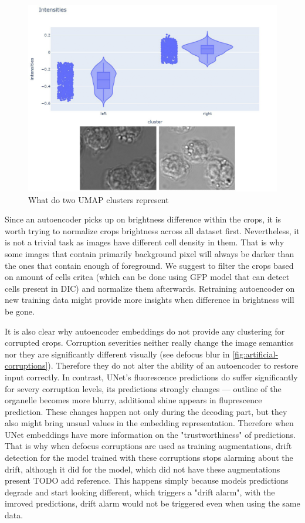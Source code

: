 \begin{figure}[H]
	\begin{center}
		\includegraphics[width=0.5\linewidth]{bilder/ae-embeddings/brighter-darker.png}
		\caption{What do two UMAP clusters represent}
		\label{fig:ae-brighter-darker}
	\end{center}
\end{figure}

Since an autoencoder picks up on brightness difference within the crops, it is worth trying to normalize crops brightness across all dataset first. Nevertheless, it is not a trivial task as images have different cell density in them. That is why some images that contain primarily background pixel will always be darker than the ones that contain enough of foreground. We suggest to filter the crops based on amount of cells critea (which can be done using GFP model that can detect cells present in DIC) and normalize them afterwards. Retraining autoencoder on new training data might provide more insights when difference in brightness will be gone.

It is also clear why autoencoder embeddings do not provide any clustering for corrupted crops. Corruption severities neither really change the image semantics nor they are significantly different visually (see defocus blur in \ref{fig:artificial-corruptions}). Therefore they do not alter the ability of an autoencoder to restore input correctly. In contrast, UNet's fluorescence predictions do suffer significantly for severy corruption levels, its predictions strongly changes --- outline of the organelle becomes more blurry, additional shine appears in fluprescence prediction. These changes happen not only during the decoding part, but they also might bring unsual values in the embedding representation. Therefore when UNet embeddings have more information on the "trustworthiness" of predictions. That is why when defocus corruptions are used as training augmentations, drift detection for the model trained with these corruptions stops alarming about the drift, although it did for the model, which did not have these augmentations present TODO add reference. This happens simply because models predictions degrade and start looking different, which triggers a "drift alarm", with the imroved predictions, drift alarm would not be triggered even when using the same data.